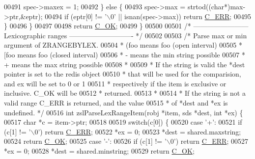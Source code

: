 \begin{DoxyCode}
00491             spec->maxex = 1;
00492         \} \textcolor{keywordflow}{else} \{
00493             spec->max = strtod((\textcolor{keywordtype}{char}*)max->ptr,&eptr);
00494             \textcolor{keywordflow}{if} (eptr[0] != \textcolor{stringliteral}{'\(\backslash\)0'} || isnan(spec->max)) \textcolor{keywordflow}{return} \hyperlink{server_8h_af98ac28d5f4d23d7ed5985188e6fb7d1}{C\_ERR};
00495         \}
00496     \}
00497 
00498     \textcolor{keywordflow}{return} \hyperlink{server_8h_a303769ef1065076e68731584e758d3e1}{C\_OK};
00499 \}
00500 
00501 \textcolor{comment}{/* ------------------------ Lexicographic ranges ---------------------------- */}
00502 
00503 \textcolor{comment}{/* Parse max or min argument of ZRANGEBYLEX.}
00504 \textcolor{comment}{  * (foo means foo (open interval)}
00505 \textcolor{comment}{  * [foo means foo (closed interval)}
00506 \textcolor{comment}{  * - means the min string possible}
00507 \textcolor{comment}{  * + means the max string possible}
00508 \textcolor{comment}{  *}
00509 \textcolor{comment}{  * If the string is valid the *dest pointer is set to the redis object}
00510 \textcolor{comment}{  * that will be used for the comparision, and ex will be set to 0 or 1}
00511 \textcolor{comment}{  * respectively if the item is exclusive or inclusive. C\_OK will be}
00512 \textcolor{comment}{  * returned.}
00513 \textcolor{comment}{  *}
00514 \textcolor{comment}{  * If the string is not a valid range C\_ERR is returned, and the value}
00515 \textcolor{comment}{  * of *dest and *ex is undefined. */}
00516 \textcolor{keywordtype}{int} zslParseLexRangeItem(robj *item, sds *dest, \textcolor{keywordtype}{int} *ex) \{
00517     \textcolor{keywordtype}{char} *c = item->ptr;
00518 
00519     \textcolor{keywordflow}{switch}(c[0]) \{
00520     \textcolor{keywordflow}{case} \textcolor{stringliteral}{'+'}:
00521         \textcolor{keywordflow}{if} (c[1] != \textcolor{stringliteral}{'\(\backslash\)0'}) \textcolor{keywordflow}{return} \hyperlink{server_8h_af98ac28d5f4d23d7ed5985188e6fb7d1}{C\_ERR};
00522         *ex = 0;
00523         *dest = shared.maxstring;
00524         \textcolor{keywordflow}{return} \hyperlink{server_8h_a303769ef1065076e68731584e758d3e1}{C\_OK};
00525     \textcolor{keywordflow}{case} \textcolor{stringliteral}{'-'}:
00526         \textcolor{keywordflow}{if} (c[1] != \textcolor{stringliteral}{'\(\backslash\)0'}) \textcolor{keywordflow}{return} \hyperlink{server_8h_af98ac28d5f4d23d7ed5985188e6fb7d1}{C\_ERR};
00527         *ex = 0;
00528         *dest = shared.minstring;
00529         \textcolor{keywordflow}{return} \hyperlink{server_8h_a303769ef1065076e68731584e758d3e1}{C\_OK};

\end{DoxyCode}
